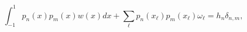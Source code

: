 \[\int_{-1}^{1}p_{n}(x)p_{m}(x)w(x)dx+\sum_{\ell}p_{n}(x_{\ell})p_{m}(x_{\ell})%
\omega_{\ell}=h_{n}\delta_{n,m},\]
